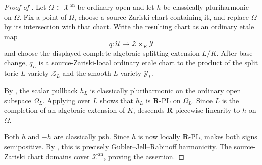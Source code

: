 
\begin{proof}[Proof of
]
Let \(\Omega\subset\mathcal X^{\mathrm{an}}\) be ordinary open and let
\(h\) be classically pluriharmonic on \(\Omega\).  Fix a point of
\(\Omega\), choose a source-Zariski chart containing it, and replace
\(\Omega\) by its intersection with that chart.  Write the resulting chart
as an ordinary etale map
\[
              q:\mathcal U\longrightarrow\mathcal Z\times_K\mathcal Y
\]
and choose the displayed complete algebraic splitting extension \(L/K\).
After base change, \(q_L\) is a source-Zariski-local ordinary etale chart to
the product of the split toric \(L\)-variety \(\mathcal Z_L\) and the smooth
\(L\)-variety \(\mathcal Y_L\).

By \cite[Proposition~7.2(6),(7)]{GR25Classical}, the scalar pullback
\(h_L\) is classically pluriharmonic on the ordinary open subspace
\(\Omega_L\).  Applying
 over \(L\) shows that
\(h_L\) is \(\mathbf R\)-PL on \(\Omega_L\).  Since \(L\) is the
completion of an algebraic extension of \(K\),
\cite[Corollary~5.12]{GJR26} descends \(\mathbf R\)-piecewise linearity to
\(h\) on \(\Omega\).

Both \(h\) and \(-h\) are classically psh.  Since \(h\) is now locally
\(\mathbf R\)-PL, \cite[Theorem~4.3]{GR25Classical} makes both signs
semipositive.  By \cite[Definition~7.2]{GJR26}, this is precisely
Gubler--Jell--Rabinoff harmonicity.  The source-Zariski chart domains cover
\(\mathcal X^{\mathrm{an}}\), proving the assertion.
\end{proof}
